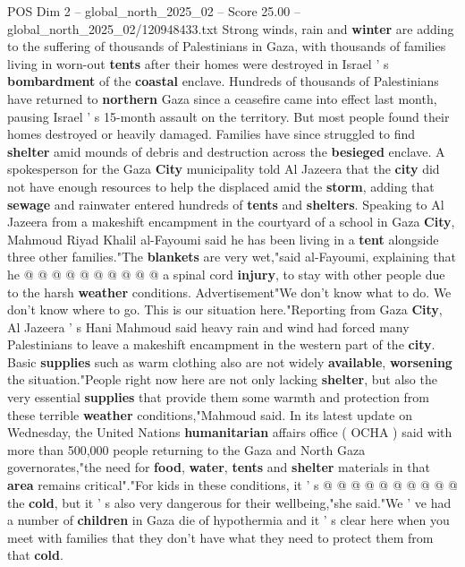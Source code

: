 \begin{textsample}{POS Dim 2 – global\_north\_2025\_02 – Score 25.00 – global\_north\_2025\_02/120948433.txt}  \label{ex:f2_pos_433}
Strong winds, rain and \textbf{winter} are adding to the suffering of thousands of Palestinians in Gaza, with thousands of families living in worn-out \textbf{tents} after their homes were destroyed in Israel ' s \textbf{bombardment} of the \textbf{coastal} enclave.
Hundreds of thousands of Palestinians have returned to \textbf{northern} Gaza since a ceasefire came into effect last month, pausing Israel ' s 15-month assault on the territory.
But most people found their homes destroyed or heavily damaged.
Families have since struggled to find \textbf{shelter} amid mounds of debris and destruction across the \textbf{besieged} enclave.
A spokesperson for the Gaza \textbf{City} municipality told Al Jazeera that the \textbf{city} did not have enough resources to help the displaced amid the \textbf{storm}, adding that \textbf{sewage} and rainwater entered hundreds of \textbf{tents} and \textbf{shelters}.
Speaking to Al Jazeera from a makeshift encampment in the courtyard of a school in Gaza \textbf{City}, Mahmoud Riyad Khalil al-Fayoumi said he has been living in a \textbf{tent} alongside three other families."The \textbf{blankets} are very wet,"said al-Fayoumi, explaining that he @ @ @ @ @ @ @ @ @ @ a spinal cord \textbf{injury}, to stay with other people due to the harsh \textbf{weather} conditions.
Advertisement"We don't know what to do.
We don't know where to go.
This is our situation here."Reporting from Gaza \textbf{City}, Al Jazeera ' s Hani Mahmoud said heavy rain and wind had forced many Palestinians to leave a makeshift encampment in the western part of the \textbf{city}.
Basic \textbf{supplies} such as warm clothing also are not widely \textbf{available}, \textbf{worsening} the situation."People right now here are not only lacking \textbf{shelter}, but also the very essential \textbf{supplies} that provide them some warmth and protection from these terrible \textbf{weather} conditions,"Mahmoud said.
In its latest update on Wednesday, the United Nations \textbf{humanitarian} affairs office ( OCHA ) said with more than 500,000 people returning to the Gaza and North Gaza governorates,"the need for \textbf{food}, \textbf{water}, \textbf{tents} and \textbf{shelter} materials in that \textbf{area} remains critical"."For kids in these conditions, it ' s @ @ @ @ @ @ @ @ @ @ the \textbf{cold}, but it ' s also very dangerous for their wellbeing,"she said."We ' ve had a number of \textbf{children} in Gaza die of hypothermia and it ' s clear here when you meet with families that they don't have what they need to protect them from that \textbf{cold}.

\end{textsample}
